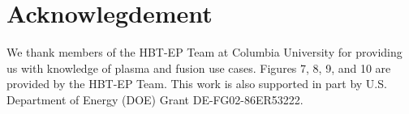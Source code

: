 \section{Acknowlegdement}

We thank members of the HBT-EP Team at Columbia University for providing
us with knowledge of plasma and fusion use cases.
Figures 7, 8, 9, and 10 are provided by the HBT-EP Team.
This work is also supported in part by U.S. Department of Energy (DOE)
Grant DE-FG02-86ER53222.
